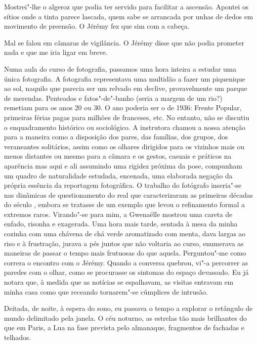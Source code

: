 Mostrei"-lhe o algeroz que podia ter servido para facilitar a
ascensão. Apontei os sítios onde a tinta parece lascada, quem sabe
se arrancada por unhas de dedos em movimento de preensão. O Jérémy fez
que sim com a cabeça.

Mal se falou em câmaras de vigilância. O Jérémy disse que não podia
prometer nada e que me iria ligar em breve.

Numa aula do curso de fotografia, passamos uma hora inteira a estudar
uma única fotografia. A fotografia representava uma multidão a fazer
um piquenique ao sol, naquilo que parecia ser um relvado em declive,
provavelmente um parque de merendas. Penteados e fatos"-de"-banho (seria a
margem de um rio?) remetiam para os anos 20 ou 30. O ano poderia ser o
de 1936: Frente Popular, primeiras férias pagas para milhões de
franceses, etc. No entanto, não se discutiu o enquadramento histórico
ou sociológico. A instrutora chamou a nossa atenção para a maneira como
a disposição dos pares, das famílias, dos grupos, dos veraneantes
solitários, assim como os olhares dirigidos para os vizinhos mais ou
menos distantes ou mesmo para a câmara e os gestos, casuais e práticos
na aparência mas aqui e ali assumindo uma rigidez próxima da pose,
compunham um quadro de naturalidade estudada, encenada, uma elaborada
negação da própria essência da reportagem fotográfica. O trabalho do
fotógrafo inseria"-se nas dinâmicas de questionamento do real que
caracterizaram as primeiras décadas do século , embora se tratasse de
um exemplo que levou o refinamento formal a extremos raros. Virando"-se
para mim, a Gwenaëlle mostrou uma careta de enfado, risonha e exagerada.
Uma hora mais tarde, sentada à mesa da minha cozinha com uma chávena de
chá verde aromatizado com menta, dava largas ao riso e à frustração,
jurava a pés juntos que não voltaria ao curso, enumerava as maneiras de
passar o tempo mais frutuosas do que aquela. Perguntou"-me como
correra o encontro com o Jérémy. Quando a conversa quebrou, vi"-a
percorrer as paredes com o olhar, como se procurasse os sintomas do
espaço devassado. Eu já notara que, à medida que as notícias se
espalhavam, as visitas entravam em minha casa como que receando
tornarem"-se cúmplices de intrusão.

Deitada, de noite, à espera do sono, eu passava o tempo a explorar o
retângulo de mundo delimitado pela janela. O céu noturno, as estrelas
tão mais brilhantes do que em Paris, a Lua na fase prevista pelo
almanaque, fragmentos de fachadas e telhados.

